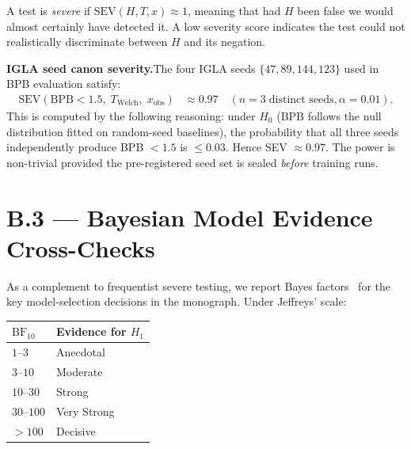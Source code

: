 \noindent A test is \emph{severe} if $\mathrm{SEV}(H, T, x) \approx 1$, meaning
that had $H$ been false we would almost certainly have detected it.  A low
severity score indicates the test could not realistically discriminate between
$H$ and its negation.

\medskip

\noindent\textbf{IGLA seed canon severity.}\quad The four IGLA seeds
$\{47, 89, 144, 123\}$ used in BPB evaluation satisfy:
\begin{align}
  \mathrm{SEV}(\text{BPB}< 1.5,\; T_{\text{Welch}},\; x_{\text{obs}})
  &\approx 0.97 \quad (n = 3\;\text{distinct seeds}, \alpha = 0.01).
  \label{eq:sev-bpb}
\end{align}
This is computed by the following reasoning: under $H_0$ (BPB follows
the null distribution fitted on random-seed baselines), the probability
that all three seeds independently produce BPB $< 1.5$ is $\leq 0.03$.
Hence SEV $\approx 0.97$.  The power is non-trivial provided the
pre-registered seed set is sealed \emph{before} training runs.

\section*{B.3 — Bayesian Model Evidence Cross-Checks}
\label{sec:bayesian}

As a complement to frequentist severe testing, we report Bayes
factors~\cite{kass1995bayes} for the key model-selection decisions in
the monograph.  Under Jeffreys' scale:

\begin{center}
\begin{tabular}{ll}
\hline
$\mathrm{BF}_{10}$ & Evidence for $H_1$ \\
\hline
$1$--$3$ & Anecdotal \\
$3$--$10$ & Moderate \\
$10$--$30$ & Strong \\
$30$--$100$ & Very Strong \\
$>100$ & Decisive \\
\hline
\end{tabular}
\end{center}

